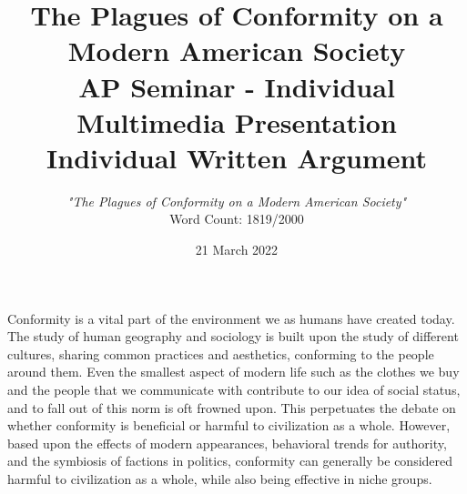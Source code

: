 \documentclass[12pt,letterpaper]{report}
\title{The Plagues of Conformity on a Modern American Society \\
  \large AP Seminar - Individual Multimedia Presentation \\
  \large Individual Written Argument}
\author{\textit{"The Plagues of Conformity on a Modern American Society"} \\
        \large Word Count: 1819/2000}
\date{21 March 2022}
\begin{document}
  \maketitle
  \par Conformity is a vital part of the environment we as humans have created today. The study of human geography and sociology is built upon the study of different cultures, sharing common practices and aesthetics, conforming to the people around them. Even the smallest aspect of modern life such as the clothes we buy and the people that we communicate with contribute to our idea of social status, and to fall out of this norm is oft frowned upon. This perpetuates the debate on whether conformity is beneficial or harmful to civilization as a whole. However, based upon the effects of modern appearances, behavioral trends for authority, and the symbiosis of factions in politics, conformity can generally be considered harmful to civilization as a whole, while also being effective in niche groups.
\end{document}
